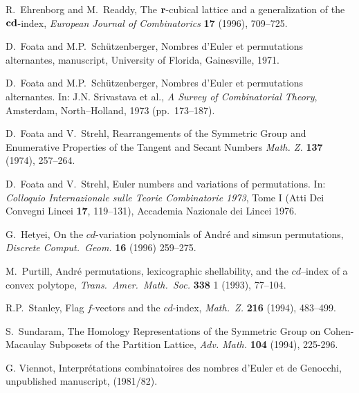 \begin{thebibliography}{1}

 R.\ Ehrenborg and M.\ Readdy,
The ${\bf r}$-cubical lattice and a  generalization of the ${\bf
cd}$-index, {\it European Journal of Combinatorics} {\bf 17} (1996),
709--725. 

 D.\ Foata and M.P.\ Sch\"{u}tzenberger,
Nombres d'Euler et permutations alternantes, manuscript, University of
Florida, Gainesville, 1971.

 D.\ Foata and M.P.\ Sch\"{u}tzenberger,
Nombres d'Euler et permutations alternantes. In: J.N. Srivastava et al.,
{\it A Survey of Combinatorial Theory}, Amsterdam, North--Holland,
1973 (pp.\ 173--187).

 D.\ Foata and V.\ Strehl, Rearrangements of the
Symmetric Group and Enumerative Properties of the Tangent and Secant
Numbers {\it Math. Z.} {\bf 137} (1974), 257--264.

 D.\ Foata and V.\ Strehl, Euler numbers and
variations of permutations.  In: {\it Colloquio Internazionale sulle Teorie
Combinatorie 1973}, Tome I  (Atti Dei Convegni Lincei
{\bf 17}, 119--131), Accademia Nazionale dei Lincei 1976.

 G.\ Hetyei, On the $cd$-variation polynomials of
Andr\'e and simsun permutations, {\it Discrete Comput.\ Geom.} {\bf 16}
(1996) 259--275.

 M.\ Purtill, Andr\'e permutations, lexicographic
shellability, and the $cd$--index of a convex polytope, {\it Trans.\
Amer.\ Math.\ Soc.} {\bf 338} 1 (1993), 77--104.

R.P.\ Stanley, Flag $f$-vectors and the $cd$-index, {\em Math.\ Z.}
{\bf 216} (1994), 483--499.

S.\ Sundaram, The Homology Representations of the Symmetric Group on
Cohen-Macaulay Subposets of the Partition Lattice, {\em Adv. Math.}
{\bf 104} (1994), 225-296.

G. Viennot, Interpr\'etations combinatoires des nombres d'Euler et
de Genocchi, unpublished manuscript, (1981/82).
\end{thebibliography}
  
 




